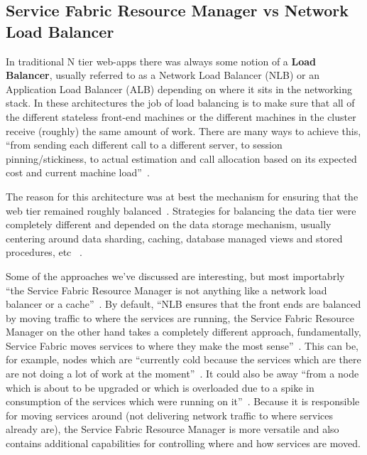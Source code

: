 \subsection{Service Fabric Resource Manager vs Network Load Balancer}

In traditional N tier web-apps there was always some notion of a {\bf Load
Balancer}, usually referred to as a Network Load Balancer (NLB) or an
Application Load Balancer (ALB) depending on where it sits in the
networking stack. In these architectures the job of load balancing is
to make sure that all of the different stateless front-end machines or
the different machines in the cluster receive (roughly) the same
amount of work. There are many ways to achieve this, ``from sending each
different call to a different server, to session pinning/stickiness,
to actual estimation and call allocation based on its expected cost
and current machine load''~\cite{hid-sp18-501-fig2and3}.

The reason for this architecture was at best the mechanism for
ensuring that the web tier remained roughly
balanced~\cite{hid-sp18-501-fig2and3}.  Strategies for balancing the
data tier were completely different and depended on the data storage
mechanism, usually centering around data sharding, caching, database
managed views and stored procedures, etc
~\cite{hid-sp18-501-fig2and3}.

Some of the approaches we've discussed are interesting, but most 
importabrly
``the Service Fabric
Resource Manager is not anything like a network load balancer or a
cache''~\cite{hid-sp18-501-fig2and3}. By default, ``NLB ensures 
that the front
ends are balanced by moving traffic to where the services are running,
the Service Fabric Resource Manager on the other hand takes a completely 
different approach, 
fundamentally, Service Fabric moves services to where they make the
most sense''~\cite{hid-sp18-501-fig2and3}. This can be, for example,
nodes which are ``currently cold because the services which are there
are not doing a lot of work at the moment''~\cite{hid-sp18-501-fig2and3}.
It could also be away ``from a node which is about to be upgraded or
which is overloaded due to a spike in consumption of the services
which were running on it''~\cite{hid-sp18-501-fig2and3}. Because it is
responsible for moving services around (not delivering network traffic
to where services already are), the Service Fabric Resource Manager is
more versatile and also contains additional capabilities for
controlling where and how services are moved.

